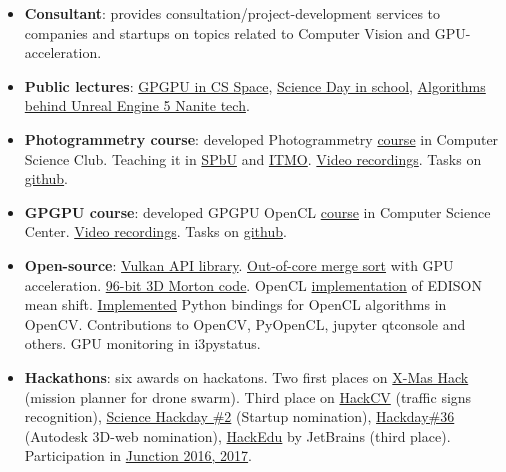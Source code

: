 \documentclass[11pt,oneside]{article}
\newcommand{\hhref}[2]{\href{#1}{\color{blue}#2}}
\begin{document}
\begin{itemize}
    \item{\textbf{Consultant}}: provides consultation/project-development services to companies and startups on topics related to Computer Vision and GPU-acceleration.

    \item{\textbf{Public lectures}}: \hhref{https://csspace.io/open-lecture/2025-gpu}{GPGPU in CS Space}, \hhref{https://www.youtube.com/watch?v=adQQoH3iXPQ}{Science Day in school}, \hhref{https://www.youtube.com/watch?v=ltUzX1IR9JI&list=PL5p-5hHpsHBolSeDn7__1c9hgPprYTjnn&index=3}{Algorithms behind Unreal Engine 5 Nanite tech}.

    \item{\textbf{Photogrammetry course}}: developed Photogrammetry  \hhref{https://compsciclub.ru/courses/photogrammetry/2021-spring/}{course} in Computer Science Club. Teaching it in \hhref{https://math-cs.spbu.ru/}{SPbU} and \hhref{https://ct.itmo.ru/}{ITMO}.  \hhref{https://www.youtube.com/watch?v=rEF0zkv2cn8&list=PL5p-5hHpsHBp4yTpeZJ_QMSmJPAuov-VF&index=1}{Video recordings}. Tasks on \hhref{https://github.com/PhotogrammetryCourse/}{github}.

    \item{\textbf{GPGPU course}}: developed GPGPU OpenCL \hhref{https://compscicenter.ru/courses/video_cards_computation/}{course} in Computer Science Center. \hhref{https://www.youtube.com/watch?v=LDt4KQEdImY&list=PLlb7e2G7aSpSkDWlyJQzT9Qx9rrgKSgAp&index=1}{Video recordings}. Tasks on \hhref{https://github.com/GPGPUCourse/}{github}.

    \item{\textbf{Open-source}: \hhref{https://github.com/GPGPUCourse/GPGPUVulkan}{Vulkan API library}. \hhref{https://github.com/PolarNick239/ExternalSortingOnGPU}{Out-of-core merge sort} with GPU acceleration. \hhref{https://gist.github.com/PolarNick239/7819fb7722fab09b37ecaee77c82cf58}{96-bit 3D Morton code}. OpenCL \hhref{https://github.com/PolarNick239/OpenMeanShift}{implementation} of EDISON mean shift. \hhref{https://github.com/opencv/opencv/pull/6078}{Implemented} Python bindings for OpenCL algorithms in OpenCV. Contributions to OpenCV, PyOpenCL, jupyter qtconsole and others. GPU monitoring in i3pystatus.}

    \item{\textbf{Hackathons}}: six awards on hackatons. Two first places on \hhref{https://github.com/PolarNick239/HackathonDroneSwarm}{X-Mas Hack} (mission planner for drone swarm). Third place on \hhref{https://career.luxoft.com/lp/hack-cv/}{HackCV} (traffic signs recognition), \hhref{http://hackday.ru/sciencehackday-2/projects\#project-1400}{Science Hackday \#2} (Startup nomination), \hhref{http://hackday.ru/hackday-36/projects\#project-1121}{Hackday\#36} (Autodesk 3D-web nomination), \hhref{https://www.hackerleague.org/hackathons/jetbrains-edtech-hackathon/blogposts/53655896e24d32cfbd000006}{HackEdu} by JetBrains (third place). Participation in \hhref{http://www.hackjunction.com/}{Junction 2016, 2017}.


\end{itemize}
\end{document}
